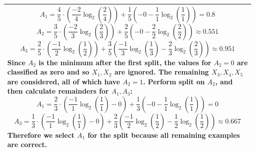 \documentclass[10pt]{article}
\newenvironment{answer}
    {\begin{center}
    \begin{tabular}{|p{0.9\textwidth}|}
    \hline
    }
    { 
    \\\hline
    \end{tabular} 
    \end{center}
    }
\begin{document}
\begin{enumerate}
\begin{answer}
  \[ A_1 = \frac{4}{5}\cdot \left(\frac{-2}{4}\log_2\left(\frac{2}{4}\right)\right) + \frac{1}{5}\left(-0-\frac{1}{1}\log_2\left(\frac{1}{1}\right)\right) = 0.8 \]
  \[ A_2 = \frac{3}{5}\cdot \left(\frac{-2}{3}\log_2\left(\frac{2}{3}\right)\right) + \frac{2}{5}\left(-0-\frac{2}{2}\log_2\left(\frac{2}{2}\right)\right) \approx 0.551 \]
  \[ A_3 = \frac{2}{5}\cdot \left(\frac{-1}{2}\log_2\left(\frac{1}{2}\right)\right) + \frac{3}{5}\left(\frac{-1}{3}\log_2\left(\frac{1}{3}\right)-\frac{2}{3}\log_2\left(\frac{2}{3}\right)\right) \approx 0.951 \]
Since $A_2$ is the minimum after the first split, the values for $A_2 = 0$ are classified as zero and so $X_1,X_2$ are ignored. The remaining $X_3,X_4,X_5$ are considered, all of which have $A_2=1$. Perform split on $A_2$, and then calculate remainders for $A_1,A_3$:
\[ A_1 = \frac{2}{3}\cdot \left(\frac{-1}{1}\log_2\left(\frac{1}{1}\right) - 0 \right) + \frac{1}{3}\left(-0-\frac{1}{1}\log_2\left(\frac{1}{1}\right)\right) = 0 \]
\[ A_3 = \frac{1}{3}\cdot \left(\frac{-1}{1}\log_2\left(\frac{1}{1}\right) - 0 \right) + \frac{2}{3}\left(\frac{-1}{2}\log_2\left(\frac{1}{2}\right) - \frac{1}{2}\log_2\left(\frac{1}{2}\right)\right) \approx 0.667 \]
Therefore we select $A_1$ for the split because all remaining examples are correct.
\end{answer}


\end{enumerate}
\end{document}
